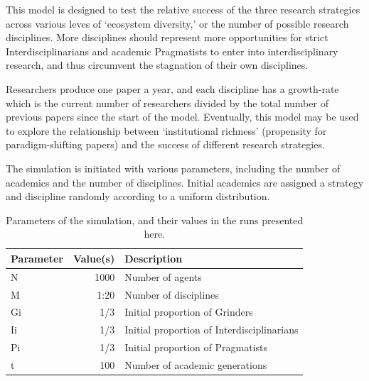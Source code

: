 \documentclass[letterpaper]{article} %
\begin{document}
This model is designed to test the relative success of the three research strategies across various leves of `ecosystem diversity,' or the number of possible research disciplines. More disciplines should represent more opportunities for strict Interdisciplinarians and academic Pragmatists to enter into interdisciplinary research, and thus circumvent the stagnation of their own disciplines.

Researchers produce one paper a year, and each discipline has a growth-rate which is the current number of researchers divided by the total number of previous papers since the start of the model. Eventually, this model may be used to explore the relationship between `institutional richness' (propensity for paradigm-shifting papers) and the success of different research strategies.

The simulation is initiated with various parameters, including the number of academics and the number of disciplines. Initial academics are assigned a strategy and discipline randomly according to a uniform distribution.

\begin{table}[H]
\begin{center}
\caption{Parameters of the simulation, and their values in the runs presented here.}
\label{tab:1}
\begin{tabular}{lrl}
  \hline
 Parameter & Value(s) & Description \\ 
  \hline
N & 1000 & Number of agents \\
M & 1:20 & Number of disciplines \\
Gi & 1/3 & Initial proportion of Grinders\\
Ii & 1/3 & Initial proportion of Interdisciplinarians\\
Pi & 1/3 & Initial proportion of Pragmatists\\
t & 100 & Number of academic generations\\
   \hline
\end{tabular}
\end{center}
\end{table}
\end{document}
